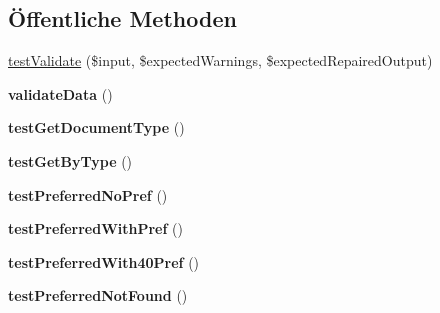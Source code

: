 \subsection*{Öffentliche Methoden}
\begin{DoxyCompactItemize}
\item 
\mbox{\hyperlink{class_sabre_1_1_v_object_1_1_component_1_1_v_card_test_afc6bb532c01bc77986c115a8d58cd2fe}{test\+Validate}} (\$input, \$expected\+Warnings, \$expected\+Repaired\+Output)
\item 
\mbox{\label{class_sabre_1_1_v_object_1_1_component_1_1_v_card_test_a1d889bc94e290e287a8743fed4de0b55}} 
{\bfseries validate\+Data} ()
\item 
\mbox{\label{class_sabre_1_1_v_object_1_1_component_1_1_v_card_test_ac675a3beed991dd8747fbe6992abdf4c}} 
{\bfseries test\+Get\+Document\+Type} ()
\item 
\mbox{\label{class_sabre_1_1_v_object_1_1_component_1_1_v_card_test_a3b37a4b41715b1d144ca76870a8f9a00}} 
{\bfseries test\+Get\+By\+Type} ()
\item 
\mbox{\label{class_sabre_1_1_v_object_1_1_component_1_1_v_card_test_a530363e6873f6b8d919a8e2276bc521d}} 
{\bfseries test\+Preferred\+No\+Pref} ()
\item 
\mbox{\label{class_sabre_1_1_v_object_1_1_component_1_1_v_card_test_a1a57c4c184d74513f7612be481424b11}} 
{\bfseries test\+Preferred\+With\+Pref} ()
\item 
\mbox{\label{class_sabre_1_1_v_object_1_1_component_1_1_v_card_test_a95b2ad7f096653c4b5542dd6523fcdd4}} 
{\bfseries test\+Preferred\+With40\+Pref} ()
\item 
\mbox{\label{class_sabre_1_1_v_object_1_1_component_1_1_v_card_test_ac683b764a9d5ea9966dc43e2ea2adedf}} 
{\bfseries test\+Preferred\+Not\+Found} ()
\item 
\mbox{\label{class_sabre_1_1_v_object_1_1_component_1_1_v_card_test_add1c451d87c087c6cad1a7cb8e4f19ac}} 

\end{DoxyCompactItemize}
